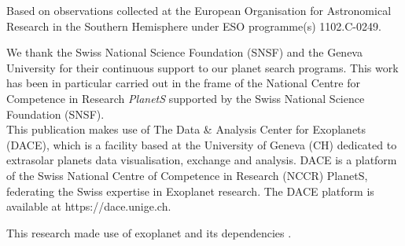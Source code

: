 \documentclass[fleqn,usenatbib]{mnras}
\begin{document}
Based on observations collected at the European Organisation for Astronomical Research in the Southern Hemisphere under ESO programme(s) 1102.C-0249.

We thank the Swiss National Science Foundation (SNSF) and the Geneva University for their continuous support to our planet search programs. This work has been in particular carried out in the frame of the National Centre for Competence in Research {\it PlanetS} supported by the Swiss National Science Foundation (SNSF).\\ %

This publication makes use of The Data \& Analysis Center for Exoplanets (DACE), which is a facility based at the University of Geneva (CH) dedicated to extrasolar planets data visualisation, exchange and analysis. DACE is a platform of the Swiss National Centre of Competence in Research (NCCR) PlanetS, federating the Swiss expertise in Exoplanet research. The DACE platform is available at https://dace.unige.ch.

This research made use of \textsf{exoplanet} \citep{exoplanet:exoplanet} and its
dependencies \citep{exoplanet:agol19, exoplanet:astropy13, exoplanet:astropy18,
exoplanet:exoplanet, exoplanet:foremanmackey17, exoplanet:foremanmackey18,
exoplanet:luger18, exoplanet:pymc3, exoplanet:theano}.











\appendix
\end{document}
